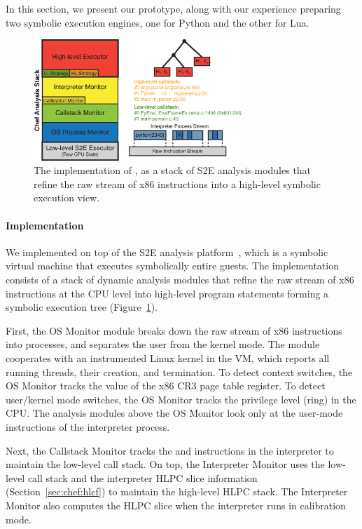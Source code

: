 In this section, we present our \chef prototype, along with our experience preparing two symbolic execution engines, one for Python and the other for Lua.

\begin{figure}
  \centering
  \includegraphics[width=0.7\textwidth]{evaluation/figures/chef-implem-stack}
  \caption{The implementation of \chef, as a stack of S2E analysis modules that refine the raw stream of x86 instructions into a high-level symbolic execution view.}
  \label{fig:eval:chef-implem-stack}
\end{figure}

\paragraph{Implementation}

We implemented \chef on top of the S2E analysis platform~\cite{s2eSystem}, which is a symbolic virtual machine that executes symbolically entire guests.
%
The implementation consists of a stack of dynamic analysis modules that refine the raw stream of x86 instructions at the CPU level into high-level program statements forming a symbolic execution tree (Figure~\ref{fig:eval:chef-implem-stack}).

First, the OS Monitor module breaks down the raw stream of x86 instructions into processes, and separates the user from the kernel mode.
%
The module cooperates with an instrumented Linux kernel in the VM, which reports all running threads, their creation, and termination.  To detect context switches, the OS Monitor tracks the value of the x86 CR3 page table register.  To detect user/kernel mode switches, the OS Monitor tracks the privilege level (ring) in the CPU.
%
The analysis modules above the OS Monitor look only at the user-mode instructions of the interpreter process.

Next, the Callstack Monitor tracks the  and  instructions in the interpreter to maintain the low-level call stack.
%
On top, the Interpreter Monitor uses the low-level call stack and the interpreter HLPC slice information (Section~\ref{sec:chef:hlcf}) to maintain the high-level HLPC stack.
%
The Interpreter Monitor also computes the HLPC slice when the interpreter runs in calibration mode.

